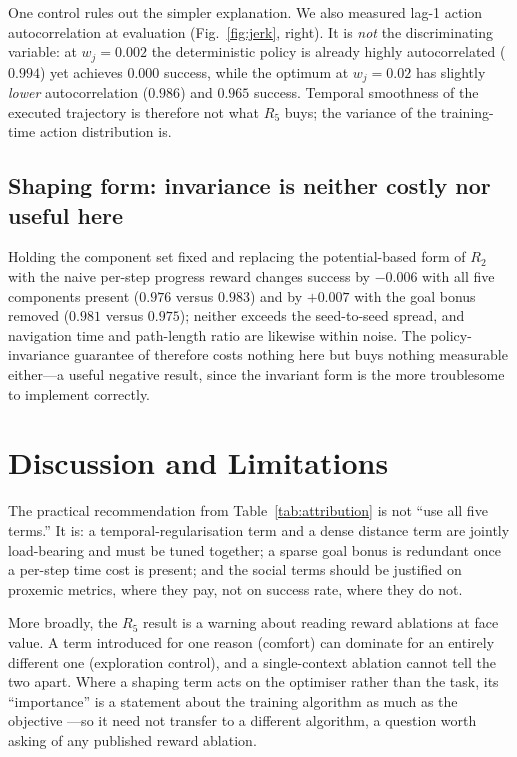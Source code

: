 \documentclass[conference]{IEEEtran}
\begin{document}
One control rules out the simpler explanation. We also measured lag-1 action
autocorrelation at evaluation (Fig.~\ref{fig:jerk}, right). It is \emph{not} the
discriminating variable: at $w_j=0.002$ the deterministic policy is already highly
autocorrelated ($0.994$) yet achieves $0.000$ success, while the optimum at
$w_j=0.02$ has slightly \emph{lower} autocorrelation ($0.986$) and $0.965$
success. Temporal smoothness of the executed trajectory is therefore not what
$R_5$ buys; the variance of the training-time action distribution is.

\subsection{Shaping form: invariance is neither costly nor useful here}
\label{sec:form}
Holding the component set fixed and replacing the potential-based form of $R_2$
with the naive per-step progress reward changes success by $-0.006$ with all five
components present ($0.976$ versus $0.983$) and by $+0.007$ with the goal bonus
removed ($0.981$ versus $0.975$); neither exceeds the seed-to-seed spread, and
navigation time and path-length ratio are likewise within noise. The
policy-invariance guarantee of \cite{ng1999policy} therefore costs nothing here
but buys nothing measurable either---a useful negative result, since the invariant
form is the more troublesome to implement correctly.

\section{Discussion and Limitations}
The practical recommendation from Table~\ref{tab:attribution} is not ``use all
five terms.'' It is: a temporal-regularisation term and a dense distance term are
jointly load-bearing and must be tuned together; a sparse goal bonus is redundant
once a per-step time cost is present; and the social terms should be justified on
proxemic metrics, where they pay, not on success rate, where they do not.

More broadly, the $R_5$ result is a warning about reading reward ablations at face
value. A term introduced for one reason (comfort) can dominate for an entirely
different one (exploration control), and a single-context ablation cannot tell the
two apart. Where a shaping term acts on the optimiser rather than the task, its
``importance'' is a statement about the training algorithm as much as the
objective \cite{andrychowicz2021what}---so it need not transfer to a different
algorithm, a question worth asking of any published reward ablation.
\end{document}
